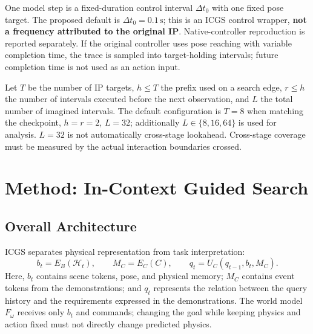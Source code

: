 \documentclass[
  10pt,
]{article}
\begin{document}
One model step is a fixed-duration control interval \(\Delta t_0\) with one fixed pose target. The proposed default is \(\Delta t_0=0.1\,\mathrm s\); this is an ICGS control wrapper, \textbf{not a frequency attributed to the original IP}. Native-controller reproduction is reported separately. If the original controller uses pose reaching with variable completion time, the trace is sampled into target-holding intervals; future completion time is not used as an action input.

Let \(T\) be the number of IP targets, \(h\leq T\) the prefix used on a search edge, \(r\leq h\) the number of intervals executed before the next observation, and \(L\) the total number of imagined intervals. The default configuration is \(T=8\) when matching the checkpoint, \(h=r=2\), \(L=32\); additionally \(L\in\{8,16,64\}\) is used for analysis. \(L=32\) is not automatically cross-stage lookahead. Cross-stage coverage must be measured by the actual interaction boundaries crossed.

\hypertarget{method-in-context-guided-search}{%
\section{Method: In-Context Guided Search}\label{method-in-context-guided-search}}

\hypertarget{kiux1ebfn-truxfac-tux1ed5ng-thux1ec3}{%
\subsection{Overall Architecture}\label{kiux1ebfn-truxfac-tux1ed5ng-thux1ec3}}

ICGS separates physical representation from task interpretation:
\begin{equation}\label{eq:factor}
b_t=E_B(\mathcal H_t),\qquad M_C=E_C(C),\qquad
q_t=U_C(q_{t-1},b_t,M_C).
\end{equation}
Here, \(b_t\) contains scene tokens, pose, and physical memory; \(M_C\) contains event tokens from the demonstrations; and \(q_t\) represents the relation between the query history and the requirements expressed in the demonstrations. The world model \(F_\omega\) receives only \(b_t\) and commands; changing the goal while keeping physics and action fixed must not directly change predicted physics.
\end{document}
